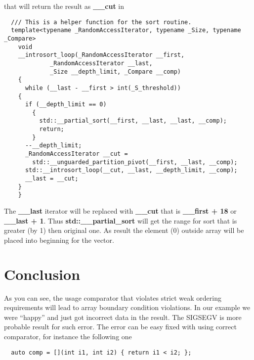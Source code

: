 \documentclass[14pt,a4paper]{article}
\begin{document}
that will return the result as \textbf{\_\_cut} in 
\begin{verbatim}
  /// This is a helper function for the sort routine.
  template<typename _RandomAccessIterator, typename _Size, typename _Compare>
    void
    __introsort_loop(_RandomAccessIterator __first,
		     _RandomAccessIterator __last,
		     _Size __depth_limit, _Compare __comp)
    {
      while (__last - __first > int(_S_threshold))
	{
	  if (__depth_limit == 0)
	    {
	      std::__partial_sort(__first, __last, __last, __comp);
	      return;
	    }
	  --__depth_limit;
	  _RandomAccessIterator __cut =
	    std::__unguarded_partition_pivot(__first, __last, __comp);
	  std::__introsort_loop(__cut, __last, __depth_limit, __comp);
	  __last = __cut;
	}
    }
\end{verbatim}
The \textbf{\_\_last} iterator will be replaced with \textbf{\_\_cut}
that is \textbf{\_\_first + 18} or \textbf{\_\_last + 1}. Thus 
\textbf{std::\_\_partial\_sort} will get the range for sort that is
greater (by 1) then original one. As result the element ($0$) outside
array will be placed into beginning for the vector. 

\section*{Conclusion}
As you can see, the usage comparator that violates strict weak ordering
requirements will lead to array boundary condition violations. In our
example we were ``happy'' and just got incorrect data in the result. The
SIGSEGV is more probable result for such error. The error can be easy
fixed with using correct comparator, for instance the following one
\begin{verbatim}
  auto comp = [](int i1, int i2) { return i1 < i2; };
\end{verbatim}

  
     
\end{document}
